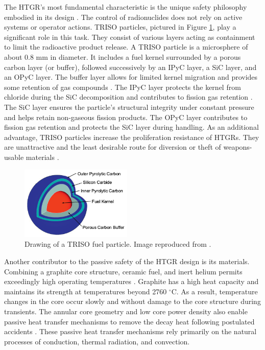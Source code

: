 The HTGR's most fundamental characteristic is the unique safety philosophy embodied in its design \cite{iaea_current_2001}.
The control of radionuclides does not rely on active systems or operator actions.
\gls{TRISO} particles, pictured in Figure \ref{fig:triso}, play a significant role in this task.
They consist of various layers acting as containment to limit the radioactive product release.
A \gls{TRISO} particle is a microsphere of about 0.8 mm in diameter.
It includes a fuel kernel surrounded by a porous carbon layer (or buffer), followed successively by an \gls{IPyC} layer, a \gls{SiC} layer, and an \gls{OPyC} layer.
The buffer layer allows for limited kernel migration and provides some retention of gas compounds \cite{oecd_nea_benchmark_2017}.
The \gls{IPyC} layer protects the kernel from chloride during the \gls{SiC} decomposition and contributes to fission gas retention \cite{demkowickz_paul_triso_2019}.
The \gls{SiC} layer ensures the particle's structural integrity under constant pressure and helps retain non-gaseous fission products.
The \gls{OPyC} layer contributes to fission gas retention and protects the \gls{SiC} layer during handling.
As an additional advantage, \gls{TRISO} particles increase the proliferation resistance of \glspl{HTGR}.
They are unattractive and the least desirable route for diversion or theft of weapons-usable materials \cite{huning_steady_2014}.

\begin{figure}[htbp!]
	\centering
	\includegraphics[height=3.5cm]{figures/triso}
	\caption{Drawing of a TRISO fuel particle. Image reproduced from \cite{hales_multidimensional_2013}.}
	\label{fig:triso}
\end{figure}

Another contributor to the passive safety of the \gls{HTGR} design is its materials.
Combining a graphite core structure, ceramic fuel, and inert helium permits exceedingly high operating temperatures \cite{ballinger_balance_2004}.
Graphite has a high heat capacity and maintains its strength at temperatures beyond 2760 $^{\circ}$C.
As a result, temperature changes in the core occur slowly and without damage to the core structure during transients.
The annular core geometry and low core power density also enable passive heat transfer mechanisms to remove the decay heat following postulated accidents \cite{neylan_modular_1988}.
These passive heat transfer mechanisms rely primarily on the natural processes of conduction, thermal radiation, and convection.

